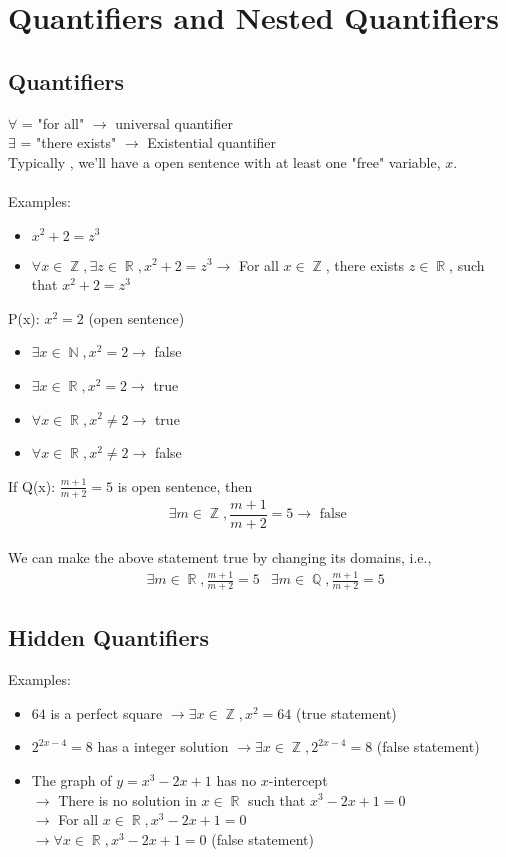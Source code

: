 \documentclass[11pt, a4paper]{memoir}
\DeclareMathOperator{\N}{{\mathbb{N}}}
\DeclareMathOperator{\Q}{{\mathbb{Q}}}
\DeclareMathOperator{\Z}{{\mathbb{Z}}}
\DeclareMathOperator{\R}{{\mathbb{R}}}
\theoremstyle{change}
\theoremstyle{plain}
\theoremstyle{nonumberplain}
\numberwithin{equation}{section}
\begin{document}
\section{Quantifiers and Nested Quantifiers}
\subsection{Quantifiers}
$\forall$ = "for all" $\to$ universal quantifier\\
$\exists$ = "there exists" $\to$ Existential quantifier\\
Typically , we'll have a open sentence with at least one "free" variable, $x$. 
\\ \vspace{1ex} \\
Examples: 
\begin{itemize}
    \item $x^2 + 2 = z^3$
    \item $\forall x \in \Z, \exists z \in \R, x^2 + 2 = z^3 \to $ For all $x \in \Z$, there exists $z \in \R$, such that $x^2 + 2 = z^3$
\end{itemize}
P(x): $x^2 = 2$ (open sentence)
\begin{itemize}
    \item $\exists x \in \N, x^2 = 2 \to $ false
    \item $\exists x \in \R, x^2 = 2 \to $ true
    \item $\forall x \in \R, x^2 \ne 2 \to $ true
    \item $\forall x \in \R, x^2 \ne 2 \to $ false
\end{itemize}
If Q(x): $\frac{m+1}{m+2} = 5$ is open sentence, then \\
$$\exists m \in \Z, \frac{m+1}{m+2} = 5 \to \text{ false }$$\\
We can make the above statement true by changing its domains, i.e., \\
\begin{align*}
    &\exists m \in \R, \frac{m+1}{m+2} = 5
    &\exists m \in \Q, \frac{m+1}{m+2} = 5
\end{align*}
\subsection{Hidden Quantifiers}
Examples:
\begin{itemize}
    \item $64$ is a perfect square $\to \exists x \in \Z, x^2 = 64$ (true statement)
    \item $2^{2x - 4} = 8$ has a integer solution $\to \exists x \in \Z, 2^{2x - 4} = 8$ (false statement)
    \item The graph of $y = x^3 - 2x + 1$ has no $x$-intercept\\ $\to $ There is no solution in $x \in \R$ such that $x^3 - 2x + 1 = 0$ \\ $\to$ For all $x \in \R, x^3 - 2x + 1 = 0$ \\$\to \forall x \in \R, x^3 - 2x + 1 = 0$ (false statement)
\end{itemize}
\end{document}
